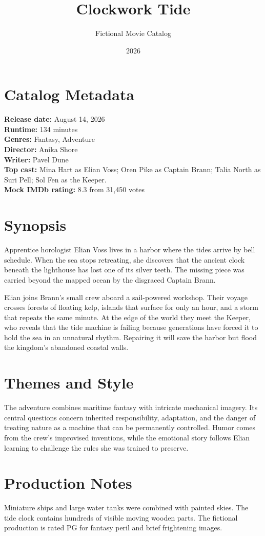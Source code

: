 \documentclass[11pt]{article}
\title{Clockwork Tide}
\author{Fictional Movie Catalog}
\date{2026}
\begin{document}
\maketitle

\section*{Catalog Metadata}
\textbf{Release date:} August 14, 2026\\
\textbf{Runtime:} 134 minutes\\
\textbf{Genres:} Fantasy, Adventure\\
\textbf{Director:} Anika Shore\\
\textbf{Writer:} Pavel Dune\\
\textbf{Top cast:} Mina Hart as Elian Voss; Oren Pike as Captain Brann;
Talia North as Suri Pell; Sol Fen as the Keeper.\\
\textbf{Mock IMDb rating:} 8.3 from 31,450 votes

\section*{Synopsis}
Apprentice horologist Elian Voss lives in a harbor where the tides arrive by
bell schedule. When the sea stops retreating, she discovers that the ancient
clock beneath the lighthouse has lost one of its silver teeth. The missing
piece was carried beyond the mapped ocean by the disgraced Captain Brann.

Elian joins Brann's small crew aboard a sail-powered workshop. Their voyage
crosses forests of floating kelp, islands that surface for only an hour, and a
storm that repeats the same minute. At the edge of the world they meet the
Keeper, who reveals that the tide machine is failing because generations have
forced it to hold the sea in an unnatural rhythm. Repairing it will save the
harbor but flood the kingdom's abandoned coastal walls.

\section*{Themes and Style}
The adventure combines maritime fantasy with intricate mechanical imagery.
Its central questions concern inherited responsibility, adaptation, and the
danger of treating nature as a machine that can be permanently controlled.
Humor comes from the crew's improvised inventions, while the emotional story
follows Elian learning to challenge the rules she was trained to preserve.

\section*{Production Notes}
Miniature ships and large water tanks were combined with painted skies. The
tide clock contains hundreds of visible moving wooden parts. The fictional
production is rated PG for fantasy peril and brief frightening images.
\end{document}
